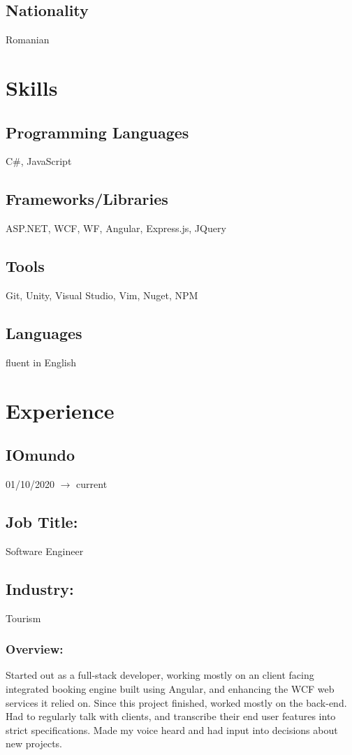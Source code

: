 \documentclass[a4paper,hidelinks,11pt]{article}
\begin{document}
\subsection{Nationality} Romanian

\section{Skills}
\subsection{Programming Languages}
C\#, JavaScript
\subsection{Frameworks/Libraries}
ASP.NET, WCF, WF, Angular, Express.js, JQuery 
\subsection{Tools}
Git, Unity, Visual Studio, Vim, Nuget, NPM
\subsection{Languages}
fluent in English


\section{Experience}
\subsection{IOmundo} 01/10/2020 $\rightarrow$ current
\subsection{Job Title:} Software Engineer
\subsection{Industry:} Tourism
\subsubsection{Overview:}
Started out as a full-stack developer, working mostly on an client facing integrated booking engine built using Angular, and enhancing the WCF web services it relied on. Since this project finished, worked mostly on the back-end. Had to regularly talk with clients, and transcribe their end user features into strict specifications. Made my voice heard and had input into decisions about new projects.
\end{document}
